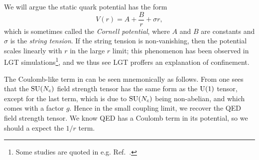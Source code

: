 We will argue the static quark potential has the form
\begin{equation}\label{eq:cornellpotential}
  V(r)=A+\frac{B}{r}+\sigma r,
\end{equation}
which is sometimes called the {\it Cornell potential},
where $A$ and $B$ are constants and
$\sigma$ is the {\it string tension}. 
If the string tension is non-vanishing, then the potential scales linearly 
with $r$ in the large $r$ limit; 
this phenomenon has been observed in LGT 
simulations\footnote{Some studies are quoted in e.g.
Ref.~\cite{montvay_quantum_1994}.},
and we thus see LGT proffers an explanation of confinement.


The Coulomb-like term in  can be seen
mnemonically as follows. From 
one sees that the $\operatorname{SU}(N_c)$ field strength tensor has the same form
as the $\operatorname{U}(1)$ tensor, except for the last term, which is due to
$\operatorname{SU}(N_c)$ being non-abelian, and which comes with a factor $g$.
Hence in the small coupling limit, we recover the QED field
strength tensor. We know QED has a Coulomb term in its potential,
so we should a expect the $1/r$ term.


